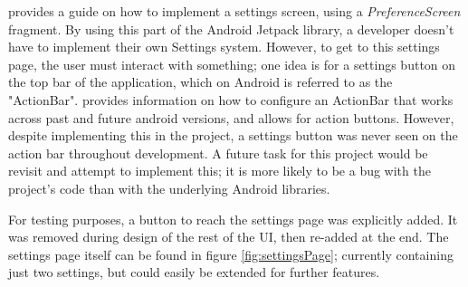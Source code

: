 \documentclass[11pt, a4paper, notitlepage]{report}
\begin{document}
\citet{settingsAndroid} provides a guide on how to implement a settings screen, using a \textit{PreferenceScreen} fragment. By using this part of the Android Jetpack library, a developer doesn't have to implement their own Settings system. However, to get to this settings page, the user must interact with something; one idea is for a settings button on the top bar of the application, which on Android is referred to as the "ActionBar". \citet{toolbarAndroid} provides information on how to configure an ActionBar that works across past and future android versions, and allows for action buttons. However, despite implementing this in the project, a settings button was never seen on the action bar throughout development. A future task for this project would be revisit and attempt to implement this; it is more likely to be a bug with the project's code than with the underlying Android libraries.

For testing purposes, a button to reach the settings page was explicitly added. It was removed during design of the rest of the UI, then re-added at the end. The settings page itself can be found in figure \ref{fig:settingsPage}; currently containing just two settings, but could easily be extended for further features.
\end{document}

